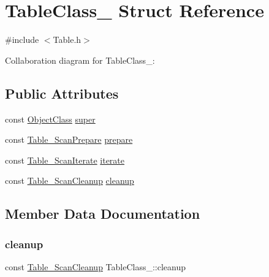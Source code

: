 \hypertarget{structTableClass__}{}\section{Table\+Class\+\_\+ Struct Reference}
\label{structTableClass__}


{\ttfamily \#include $<$Table.\+h$>$}



Collaboration diagram for Table\+Class\+\_\+\+:
\subsection*{Public Attributes}
\begin{DoxyCompactItemize}
\item 
const \hyperlink{Object_8h_a6feb151c3b8f61fae503dfbcdc3d6a54}{Object\+Class} \hyperlink{structTableClass___af28d4c718da3df18b65169687696fa41}{super}
\item 
const \hyperlink{Table_8h_a9b73c1e2f5fe404379cbd9c2b2e54a0d}{Table\+\_\+\+Scan\+Prepare} \hyperlink{structTableClass___aec75574c0e2335e9f2bd1a9519cd4d2f}{prepare}
\item 
const \hyperlink{Table_8h_a148456aa8508b5f715555919f2b265f9}{Table\+\_\+\+Scan\+Iterate} \hyperlink{structTableClass___a7525e1ab35c605e40cfbe45091872733}{iterate}
\item 
const \hyperlink{Table_8h_ad248f64af32f49ca877a8a581e35fd83}{Table\+\_\+\+Scan\+Cleanup} \hyperlink{structTableClass___a63d5cf7f8b5cb5565727e63380dd11bb}{cleanup}
\end{DoxyCompactItemize}


\subsection{Member Data Documentation}
\mbox{\label{structTableClass___a63d5cf7f8b5cb5565727e63380dd11bb}} 
\subsubsection{\texorpdfstring{cleanup}{cleanup}}
{\footnotesize\ttfamily const \hyperlink{Table_8h_ad248f64af32f49ca877a8a581e35fd83}{Table\+\_\+\+Scan\+Cleanup} Table\+Class\+\_\+\+::cleanup}

\mbox{\label{structTableClass___a7525e1ab35c605e40cfbe45091872733}} 
